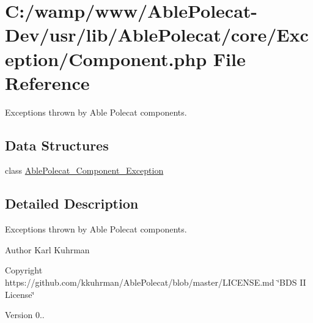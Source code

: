 \hypertarget{_exception_2_component_8php}{}\section{C\+:/wamp/www/\+Able\+Polecat-\/\+Dev/usr/lib/\+Able\+Polecat/core/\+Exception/\+Component.php File Reference}
\label{_exception_2_component_8php}


Exceptions thrown by Able Polecat components.  


\subsection*{Data Structures}
\begin{DoxyCompactItemize}
\item 
class \hyperlink{class_able_polecat___component___exception}{Able\+Polecat\+\_\+\+Component\+\_\+\+Exception}
\end{DoxyCompactItemize}


\subsection{Detailed Description}
Exceptions thrown by Able Polecat components. 

\begin{DoxyAuthor}{Author}
Karl Kuhrman 
\end{DoxyAuthor}
\begin{DoxyCopyright}{Copyright}
https\+://github.com/kkuhrman/\+Able\+Polecat/blob/master/\+L\+I\+C\+E\+N\+S\+E.\+md \char`\"{}\+B\+D\+S I\+I License\char`\"{} 
\end{DoxyCopyright}
\begin{DoxyVersion}{Version}
0.. 
\end{DoxyVersion}
